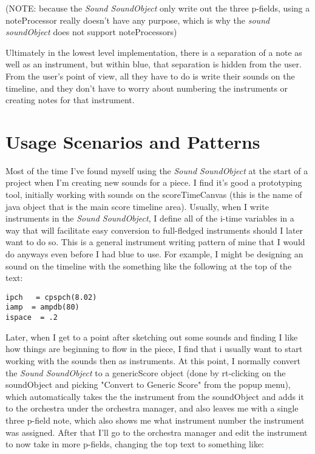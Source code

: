 (NOTE: because the \emph{Sound SoundObject} only write out the three
p-fields, using a noteProcessor really doesn't have any purpose, which
is why the \emph{sound soundObject} does not support noteProcessors)

Ultimately in the lowest level implementation, there is a separation of
a note as well as an instrument, but within blue, that separation is
hidden from the user. From the user's point of view, all they have to do
is write their sounds on the timeline, and they don't have to worry
about numbering the instruments or creating notes for that instrument.

\section{Usage Scenarios and Patterns}

Most of the time I've found myself using the \emph{Sound SoundObject} at
the start of a project when I'm creating new sounds for a piece. I find
it's good a prototyping tool, initially working with sounds on the
scoreTimeCanvas (this is the name of java object that is the main score
timeline area). Usually, when I write instruments in the \emph{Sound
SoundObject}, I define all of the i-time variables in a way that will
facilitate easy conversion to full-fledged instruments should I later
want to do so. This is a general instrument writing pattern of mine that
I would do anyways even before I had blue to use. For example, I might
be designing an sound on the timeline with the something like the
following at the top of the text:

\begin{verbatim}
ipch   = cpspch(8.02)
iamp  = ampdb(80)
ispace  = .2
\end{verbatim}

Later, when I get to a point after sketching out some sounds and finding
I like how things are beginning to flow in the piece, I find that i
usually want to start working with the sounds then as instruments. At
this point, I normally convert the \emph{Sound SoundObject} to a
genericScore object (done by rt-clicking on the soundObject and picking
"Convert to Generic Score" from the popup menu), which automatically
takes the the instrument from the soundObject and adds it to the
orchestra under the orchestra manager, and also leaves me with a single
three p-field note, which also shows me what instrument number the
instrument was assigned. After that I'll go to the orchestra manager and
edit the instrument to now take in more p-fields, changing the top text
to something like:

